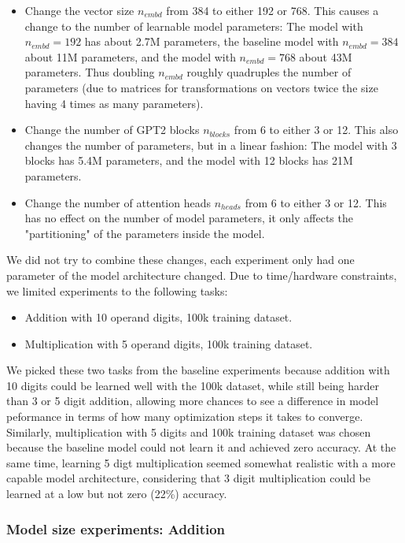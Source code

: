 \begin{itemize}
    \item Change the vector size $n_{embd}$ from 384 to either 192 or 768. This causes a change to the number of learnable model parameters: The model with $n_{embd}=192$ has about 2.7M parameters, the baseline model with $n_{embd}=384$ about 11M parameters, and the model with $n_{embd}=768$ about 43M parameters. Thus doubling $n_{embd}$ roughly quadruples the number of parameters (due to matrices for transformations on vectors twice the size having 4 times as many parameters).
    \item Change the number of GPT2 blocks $n_{blocks}$ from 6 to either 3 or 12. This also changes the number of parameters, but in a linear fashion: The model with 3 blocks has 5.4M parameters, and the model with 12 blocks has 21M parameters. 
    \item Change the number of attention heads $n_{heads}$ from 6 to either 3 or 12. This has no effect on the number of model parameters, it only affects the "partitioning" of the parameters inside the model.
\end{itemize}

We did not try to combine these changes, each experiment only had one parameter of the model architecture changed.
Due to time/hardware constraints, we limited experiments to the following tasks:

\begin{itemize}
    \item Addition with 10 operand digits, 100k training dataset.
    \item Multiplication with 5 operand digits, 100k training dataset.
\end{itemize}

We picked these two tasks from the baseline experiments because addition with 10 digits could be learned well with the 100k dataset, while still being harder than 3 or 5 digit addition, allowing more chances to see a difference in model peformance in terms of how many optimization steps it takes to converge.
Similarly, multiplication with 5 digits and 100k training dataset was chosen because the baseline model could not learn it and achieved zero accuracy. At the same time, learning 5 digt multiplication seemed somewhat realistic with a more capable model architecture, considering that 3 digit multiplication could be learned at a low but not zero (22\%) accuracy.

\subsubsection{Model size experiments: Addition}

